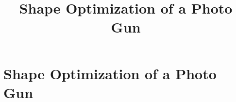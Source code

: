 \documentclass[ngerman, accentcolor=9b, marginpar=false, pdfa=false]{tudapub}
\begin{document}
\title{Shape Optimization of a Photo Gun}


\section{Shape Optimization of a Photo Gun}


\printbibliography
\end{document}
